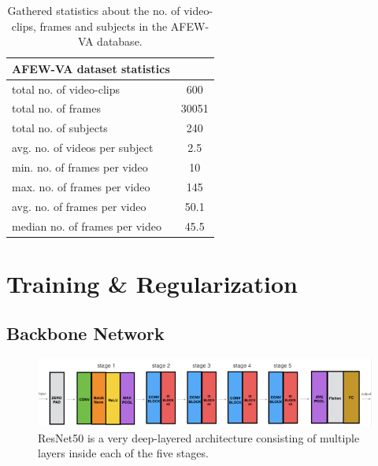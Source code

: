 \begin{table}[H]
\begin{center}
\begin{tabular}{@{}lc@{}}
\toprule
\textbf{AFEW-VA dataset statistics} &  \\ \midrule
total no. of video-clips & 600 \\
total no. of frames & 30051 \\
total no. of subjects & 240 \\
avg. no. of videos per subject & 2.5 \\
min. no. of frames per video & 10 \\
max. no. of frames per video & 145 \\
avg. no. of frames per video & 50.1 \\
median no. of frames per video & 45.5 \\ \bottomrule
\end{tabular}
\caption{Gathered statistics about the no. of video-clips, frames and subjects in the AFEW-VA database.}
\label{tab:DatasetStatistics}
\end{center}
\end{table}


\section{Training \& Regularization}
\subsection{Backbone Network}

\begin{figure}[H]
  \begin{center}
  \includegraphics[angle=0, width=1.0\textwidth]{Figures/resnet50.png}
  \caption{ResNet50 \citep{Dwivedi:2019:ResNetInKeras} is a very deep-layered architecture consisting of multiple layers inside each of the five stages.}
  \label{fig:ResNet50Architecture}
  \end{center}
\end{figure}

